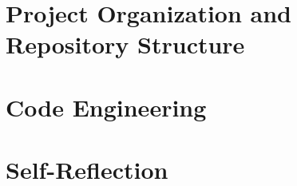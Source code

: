\documentclass[openany]{mitthesis}
\theoremstyle{definition}
\begin{document}
\tableofcontents
\listoffigures
\listoftables

\pgfplotsset{compat=1.18}

%



\chapter{Project Organization and Repository Structure}
    

\chapter{Code Engineering}
    
    
    




    

\chapter{Self-Reflection}
    
    
    

% 
\end{document}
